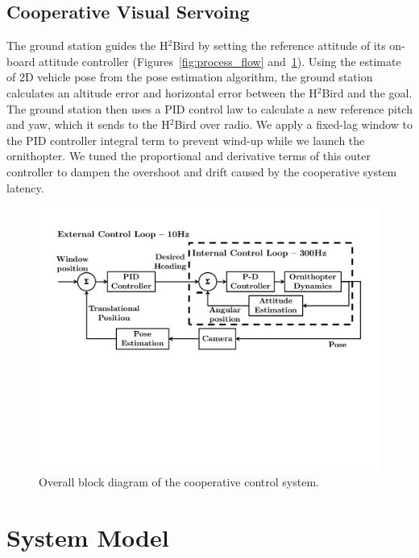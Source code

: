 \documentclass{aamas2013}
\begin{document}
\subsection{Cooperative Visual Servoing}
\label{sec:visual_servoing_concept}
The ground station guides the H$^2$Bird by setting the
reference attitude of its on-board attitude 
controller (Figures~\ref{fig:process_flow} and~\ref{fig:block_diagram}). Using 
the estimate of 2D vehicle pose from the pose estimation algorithm, the 
ground station calculates an altitude error and horizontal error between the H$^2$Bird and the goal. The ground 
station then uses a PID control law to calculate a new reference pitch and yaw, 
which it sends to the H$^2$Bird over radio. 
We apply a fixed-lag window to the PID 
controller integral term to prevent wind-up while we launch the ornithopter. 
We tuned the proportional and derivative terms of this outer controller to 
dampen the overshoot and drift caused by the cooperative system latency.
\begin{figure}[tb]
\centering
\includegraphics[width=\linewidth]{figures/block_diagrams.pdf}
\caption{Overall block diagram of the cooperative control system.}
\label{fig:block_diagram}
\end{figure}

\section{System Model}
\label{sec:system_model}
\end{document}
